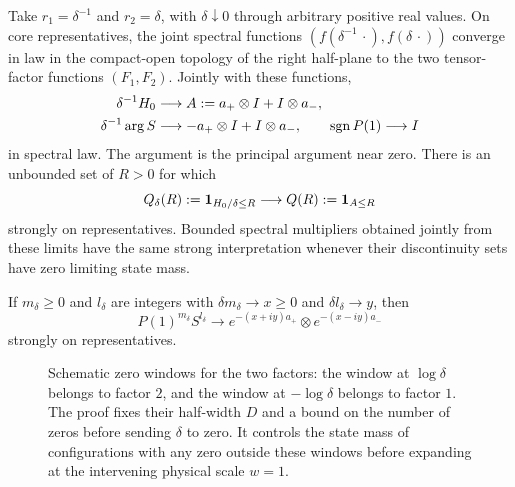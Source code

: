 \begin{proposition}\label{prop:two-scale}
Take $r_1=\delta^{-1}$ and $r_2=\delta$, with $\delta\downarrow0$ through
arbitrary positive real values. On core representatives, the joint spectral
functions $(f(\delta^{-1}\,\cdot),f(\delta\,\cdot))$ converge in law in
the compact-open topology of the right half-plane to the two tensor-factor
functions $(F_1,F_2)$. Jointly with these functions,
\begin{equation}\label{eq:chiral-scaled-spectrum}
\begin{split}
 \delta^{-1}H_0&\longrightarrow A:=a_+\otimes I+I\otimes a_-,\\
 \delta^{-1}\arg S&\longrightarrow -a_+\otimes I+I\otimes a_-,
       \qquad \operatorname{sgn} P(1)\longrightarrow I
\end{split}
\end{equation}
in spectral law. The argument is the principal argument near zero.
There is an unbounded set of $R>0$ for which
\begin{equation}\label{eq:chiral-band-limit}
 Q_\delta(R):=\mathbf1_{H_0/\delta\le R}
                       \longrightarrow Q(R):=\mathbf1_{A\le R}
\end{equation}
strongly on representatives. Bounded spectral multipliers obtained jointly
from these limits have the same strong interpretation whenever their
discontinuity sets have zero limiting state mass.

If $m_\delta\ge0$ and $l_\delta$ are integers with
$\delta m_\delta\to x\ge0$ and $\delta l_\delta\to y$, then
\begin{equation}\label{eq:chiral-semigroup-limit}
 P(1)^{m_\delta}S^{l_\delta}\longrightarrow
       e^{-(x+iy)a_+}\otimes e^{-(x-iy)a_-}
\end{equation}
strongly on representatives.
\end{proposition}

\begin{figure}[htbp]
\centering

\caption{Schematic zero windows for the two factors: the window at
$\log\delta$ belongs to factor $2$, and the window at $-\log\delta$
belongs to factor $1$. The proof fixes their half-width $D$ and a bound
on the number of zeros before sending $\delta$ to zero. It controls
the state mass of configurations with any zero outside these windows
before expanding at the intervening physical scale $w=1$.}
\label{fig:chiral-windows}
\end{figure}


